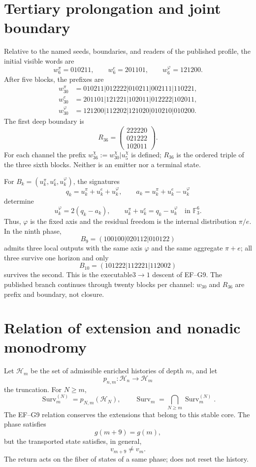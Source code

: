 \section{Tertiary prolongation and joint boundary}

Relative to the named seeds, boundaries, and readers of the published
profile, the initial visible words are
\[
 w_6^\pi=010211,\qquad w_6^e=201101,\qquad
 w_6^\varphi=121200.
\]
After five blocks, the prefixes are
\[
\begin{aligned}
w_{30}^{\pi}&=010211|012222|010211|002111|110221,\\
w_{30}^{e}&=201101|121221|102011|012222|102011,\\
w_{30}^{\varphi}&=121200|112202|121020|010210|010200.
\end{aligned}
\]
The first deep boundary is
\[
 R_{36}=
 \begin{pmatrix}222220\\021222\\102011\end{pmatrix}.
\]
For each channel the prefix
\(w_{36}^\chi:=w_{30}^\chi|u_5^\chi\) is defined; \(R_{36}\) is the ordered triple of
the three sixth blocks. Neither is an emitter nor a terminal state.

For \(B_k=(u_k^\pi,u_k^e,u_k^\varphi)\), the signatures
\[
 q_k=u_k^\pi+u_k^e+u_k^\varphi,\qquad
 a_k=u_k^\pi+u_k^e-u_k^\varphi
\]
determine
\[
 u_k^\varphi=2(q_k-a_k),\qquad
 u_k^\pi+u_k^e=q_k-u_k^\varphi
 \quad\text{in }\mathbb F_3^6.
\]
Thus, \(\varphi\) is the fixed axis and the residual freedom is the
internal distribution \(\pi/e\). In the ninth phase,
\[
 B_9=(100100|020112|010122)
\]
admits three local outputs with the same axis \(\varphi\) and the same aggregate
\(\pi+e\); all three survive one horizon and only
\[
 B_{10}=(101222|112221|112002)
\]
survives the second. This is the executable\(3\to1\) descent of EF--G9.
The published branch continues through twenty blocks per
channel: \(w_{30}\) and \(R_{36}\) are prefix and boundary, not
closure.

\section{Relation of extension and nonadic monodromy}
\label{sec:extension-monodromia-tpk}

Let \(\mathcal H_m\) be the set of admissible enriched histories of
depth \(m\), and let
\[
 p_{n,m}:\mathcal H_n\longrightarrow\mathcal H_m
\]
the truncation. For \(N\geq m\),
\[
 \operatorname{Surv}_m^{(N)}=p_{N,m}(\mathcal H_N),
 \qquad
 \operatorname{Surv}_m=\bigcap_{N\geq m}\operatorname{Surv}_m^{(N)}.
\]
The EF--G9 relation conserves the extensions that belong to this stable core.
The phase satisfies
\[
 g(m+9)=g(m),
\]
but the transported state satisfies, in general,
\[
 v_{m+9}\ne v_m.
\]
The return acts on the fiber of states of a same phase; does not reset the
history.

